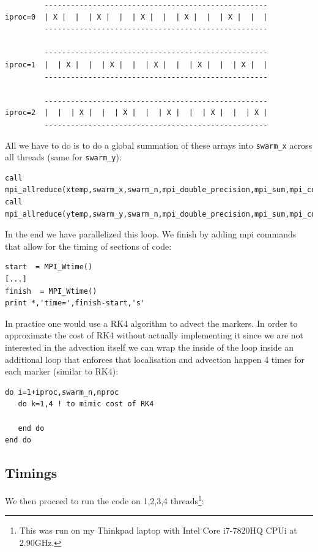 \begin{verbatim}
         ---------------------------------------------------
iproc=0  | X |  |  | X |  |  | X |  |  | X |  |  | X |  |  |
         ---------------------------------------------------

         ---------------------------------------------------
iproc=1  |  | X |  |  | X |  |  | X |  |  | X |  |  | X |  | 
         ---------------------------------------------------

         ---------------------------------------------------
iproc=2  |  |  | X |  |  | X |  |  | X |  |  | X |  |  | X |
         ---------------------------------------------------
\end{verbatim}
All we have to do is to do a global summation of these arrays into \verb|swarm_x| across 
all threads (same for \verb|swarm_y|):
\begin{verbatim}
call mpi_allreduce(xtemp,swarm_x,swarm_n,mpi_double_precision,mpi_sum,mpi_comm_world,ierr)
call mpi_allreduce(ytemp,swarm_y,swarm_n,mpi_double_precision,mpi_sum,mpi_comm_world,ierr)
\end{verbatim}
In the end we have parallelized this loop. We finish by adding 
mpi commands that allow for the timing of sections of code:
\begin{verbatim}
start  = MPI_Wtime()
[...]
finish  = MPI_Wtime()
print *,'time=',finish-start,'s'
\end{verbatim}
In practice one would use a RK4 algorithm to advect the markers. 
In order to approximate the cost of RK4 without actually implementing it since 
we are not interested in the advection itself we can wrap the inside of the loop 
inside an additional loop that enforces that localisation and advection happen 
4 times for each marker (similar to RK4):
\begin{verbatim}
do i=1+iproc,swarm_n,nproc
   do k=1,4 ! to mimic cost of RK4

   end do
end do
\end{verbatim}

\subsection*{Timings}

We then proceed to run the code on 1,2,3,4 threads\footnote{This 
was run on my Thinkpad laptop with Intel Core i7-7820HQ CPUi at 2.90GHz.}:

